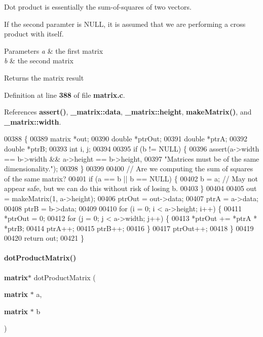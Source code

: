 Dot product is essentially the sum-\/of-\/squares of two vectors.

If the second paramter is N\+U\+LL, it is assumed that we are performing a cross product with itself. 
\begin{DoxyParams}{Parameters}
{\em a} & the first matrix \\
\hline
{\em b} & the second matrix \\
\hline
\end{DoxyParams}
\begin{DoxyReturn}{Returns}
the matrix result 
\end{DoxyReturn}


Definition at line \textbf{ 388} of file \textbf{ matrix.\+c}.



References \textbf{ assert()}, \textbf{ \+\_\+matrix\+::data}, \textbf{ \+\_\+matrix\+::height}, \textbf{ make\+Matrix()}, and \textbf{ \+\_\+matrix\+::width}.


\begin{DoxyCode}
00388                                                 \{
00389   matrix *out;
00390   \textcolor{keywordtype}{double} *ptrOut;
00391   \textcolor{keywordtype}{double} *ptrA;
00392   \textcolor{keywordtype}{double} *ptrB;
00393   \textcolor{keywordtype}{int} i, j;
00394 
00395   \textcolor{keywordflow}{if} (b != NULL) \{
00396     assert(a->width == b->width && a->height == b->height,
00397            \textcolor{stringliteral}{"Matrices must be of the same dimensionality."});
00398   \}
00399 
00400   \textcolor{comment}{// Are we computing the sum of squares of the same matrix?}
00401   \textcolor{keywordflow}{if} (a == b || b == NULL) \{
00402     b = a; \textcolor{comment}{// May not appear safe, but we can do this without risk of losing b.}
00403   \}
00404 
00405   out = makeMatrix(1, a->height);
00406   ptrOut = out->data;
00407   ptrA = a->data;
00408   ptrB = b->data;
00409 
00410   \textcolor{keywordflow}{for} (i = 0; i < a->height; i++) \{
00411     *ptrOut = 0;
00412     \textcolor{keywordflow}{for} (j = 0; j < a->width; j++) \{
00413       *ptrOut += *ptrA * *ptrB;
00414       ptrA++;
00415       ptrB++;
00416     \}
00417     ptrOut++;
00418   \}
00419 
00420   \textcolor{keywordflow}{return} out;
00421 \}
\end{DoxyCode}
\mbox{\label{a00125_a0b568a64e81a56779c2141b424475976}} 
\paragraph{dot\+Product\+Matrix()}
{\footnotesize\ttfamily \textbf{ matrix}$\ast$ dot\+Product\+Matrix (\begin{DoxyParamCaption}\item[{\textbf{ matrix} $\ast$}]{a,  }\item[{\textbf{ matrix} $\ast$}]{b }\end{DoxyParamCaption})}



